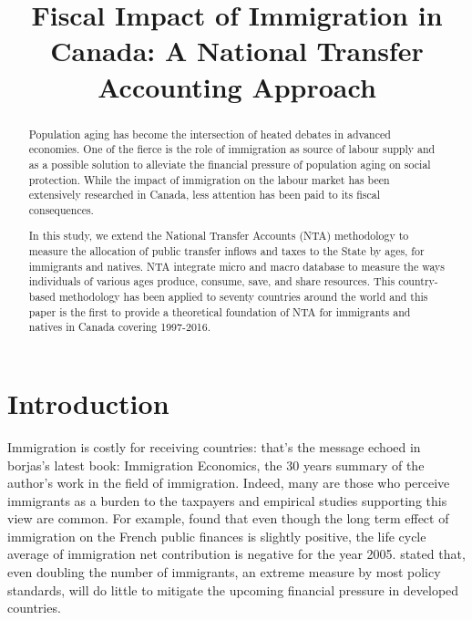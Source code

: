 


\title{Fiscal Impact of Immigration in Canada: A National Transfer Accounting Approach}
\author{}
\date{}


\maketitle
\begin{abstract}
  Population aging has become the intersection of heated debates in advanced economies. One of the fierce is the role of immigration as source of labour supply and as a possible solution to alleviate the financial pressure of population aging on social protection. While the impact of immigration on the labour market has been extensively researched in Canada, less attention has been paid to its fiscal consequences.

  \vspace{0.7em}\par
  In this study, we extend the National Transfer Accounts (NTA) methodology to measure the allocation of public transfer inflows and taxes to the State by ages, for immigrants and natives. NTA integrate micro and macro database to measure the ways individuals of various ages produce, consume, save, and share resources. This country-based methodology has been applied to seventy countries around the world and this paper is the first to provide a theoretical foundation of NTA for immigrants and natives in Canada covering 1997-2016.

\end{abstract}

  \section*{Introduction}\label{sec:into}
  Immigration is costly for receiving countries: that's the message echoed in borjas's latest book: Immigration Economics, the 30 years summary of the author's work in the field of immigration\citep{Card:2016ku}. Indeed, many are those who perceive immigrants as a burden to the taxpayers and empirical studies supporting this view are common. For example, \citet{Chojnicki:2011vu} found that even though the long term effect of immigration on the French public finances is slightly positive, the life cycle average of immigration net contribution is negative for the year 2005. \citet{Fehr:2003gq} stated that, even doubling the number of immigrants, an extreme measure by most policy standards, will do little to mitigate the upcoming financial pressure in developed countries.

